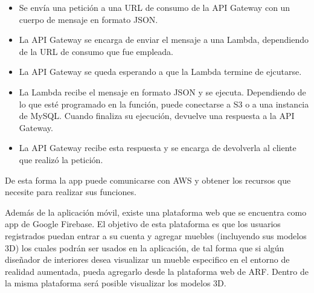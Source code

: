 \begin{itemize}
	\item Se envía una petición a una URL de consumo de la API Gateway con un cuerpo de mensaje en formato JSON.
	\item La API Gateway se encarga de enviar el mensaje a una Lambda, dependiendo de la URL de consumo que fue empleada.
	\item La API Gateway se queda esperando a que la Lambda termine de ejcutarse.
	\item La Lambda recibe el mensaje en formato JSON y se ejecuta. Dependiendo de lo que esté programado en la función, puede conectarse a S3 o a una instancia de MySQL. Cuando finaliza su ejecución, devuelve una respuesta a la API Gateway.
	\item La API Gateway recibe esta respuesta y se encarga de devolverla al cliente que realizó la petición.
\end{itemize}

De esta forma la app puede comunicarse con AWS y obtener los recursos que necesite para realizar sus funciones.\par
Además de la aplicación móvil, existe una plataforma web que se encuentra como app de Google Firebase. El objetivo de esta plataforma es que los usuarios registrados puedan entrar a su cuenta y agregar muebles (incluyendo sus modelos 3D) los cuales podrán ser usados en la aplicación, de tal forma que si algún diseñador de interiores desea visualizar un mueble especifico en el entorno de realidad aumentada, pueda agregarlo desde la plataforma web de ARF. Dentro de la misma plataforma será posible visualizar los modelos 3D.


